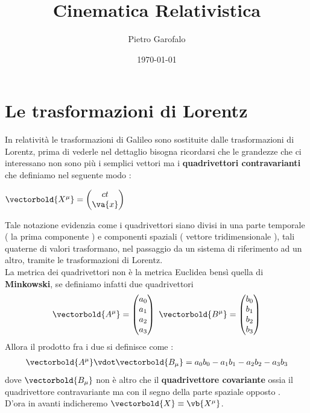 \documentclass[a4paper, 12pt, twoside]{report}
\title{Cinematica Relativistica}
\author{Pietro Garofalo}
\date{\today}
\begin{document}
\maketitle
\newpage
\tableofcontents

\chapter{Le trasformazioni di Lorentz }
In relatività le trasformazioni di Galileo sono sostituite dalle trasformazioni di Lorentz, prima di vederle nel dettaglio bisogna ricordarsi 
che le grandezze che ci interessano non sono più i semplici vettori ma i \textbf{ quadrivettori contravarianti } che definiamo nel seguente modo :
\begin{center}
        
        $ \vectorbold{X^{\mu}} = \begin{pmatrix} ct\\ \va{x} \end{pmatrix} $

\end{center}
Tale notazione evidenzia come i quadrivettori siano divisi in una parte temporale ( la prima componente ) e componenti spaziali ( vettore tridimensionale ), 
tali quaterne di valori trasformano, nel passaggio da un sistema di riferimento ad un altro, tramite le trasformazioni di Lorentz. \\
La metrica dei quadrivettori non è la metrica Euclidea bensì quella di \textbf{Minkowski}, se definiamo infatti due quadrivettori 
\begin{align*}
        \vectorbold{A^{\mu}} = \begin{pmatrix} a_0\\a_1\\a_2\\a_3\end{pmatrix}
        \
        \vectorbold{B^{\mu}} = \begin{pmatrix} b_0\\b_1\\b_2\\b_3\end{pmatrix}
\end{align*}
Allora il prodotto fra i due si definisce come :
\begin{align*}
        \vectorbold{A^{\mu}}\vdot\vectorbold{B_{\mu}} = a_0b_0 - a_1b_1 - a_2b_2 - a_3b_3
\end{align*}
dove $\vectorbold{B_{\mu}}$ non è altro che il \textbf{quadrivettore covariante} ossia il quadrivettore contravariante ma con il segno della parte spaziale opposto .\\
D'ora in avanti indicheremo $\vectorbold{X} \equiv \vb{X^{\mu}} $.
\newpage
\end{document}
